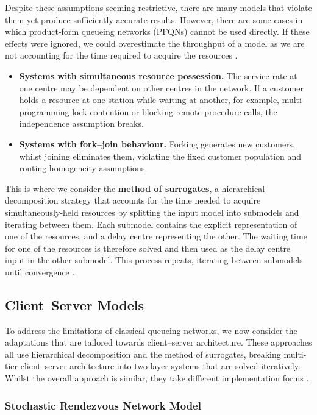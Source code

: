 Despite these assumptions seeming restrictive, there are many models that violate them yet produce sufficiently accurate results. However, there are some cases in which product-form queueing networks (PFQNs) cannot be used directly. If these effects were ignored, we could overestimate the throughput of a model as we are not accounting for the time required to acquire the resources \cite{franks99}.

\begin{itemize}
\item \textbf{Systems with simultaneous resource possession.} The service rate at one centre may be dependent on other centres in the network. If a customer holds a resource at one station while waiting at another, for example, multi-programming lock contention or blocking remote procedure calls, the independence assumption breaks.
\item \textbf{Systems with fork–join behaviour.} Forking generates new customers, whilst joining eliminates them, violating the fixed customer population and routing homogeneity assumptions.
\end{itemize}


This is where we consider the \textbf{method of surrogates}, a hierarchical decomposition strategy that accounts for the time needed to acquire simultaneously-held resources by splitting the input model into submodels and iterating between them. Each submodel contains the explicit representation of one of the resources, and a delay centre representing the other. The waiting time for one of the resources is therefore solved and then used as the delay centre input in the other submodel. This process repeats, iterating between submodels until convergence \cite{franks99}.

\subsection{Client–Server Models}
\label{sec:bg-client-server}

To address the limitations of classical queueing networks, we now consider the adaptations that are tailored towards client–server architecture. These approaches all use hierarchical decomposition and the method of surrogates, breaking multi-tier client–server architecture into two-layer systems that are solved iteratively. Whilst the overall approach is similar, they take different implementation forms \cite{franks99}.

\subsubsection*{Stochastic Rendezvous Network Model}

